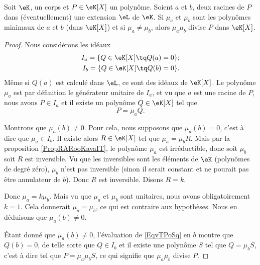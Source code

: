 \begin{proposition} \label{PropyMTEbH}
    Soit \( \eK\), un corps et \( P\in \eK[X]\) un polynôme. Soient \( a\) et \( b\), deux racines de \( P\) dans (éventuellement) une extension \( \eL\) de \( \eK\). Si \( \mu_a\) et \( \mu_b\) sont les polynômes minimaux de \( a\) et \( b\) (dans \( \eK[X]\)) et si \( \mu_a\neq \mu_b\), alors \( \mu_a\mu_b\) divise \( P\) dans \( \eK[X]\).
\end{proposition}

\begin{proof}
    Nous considérons les idéaux
    \begin{subequations}
        \begin{align}
            I_a=\{ Q\in \eK[X]\tq Q(a)=0 \};\\
            I_b=\{ Q\in \eK[X]\tq Q(b)=0 \}.
        \end{align}
    \end{subequations}
    Même si \( Q(a)\) est calculé dans \( \eL\), ce sont des idéaux de \( \eK[X]\). Le polynôme \( \mu_a\) est par définition le générateur unitaire de \( I_a\), et vu que \( a\) est une racine de \( P\), nous avons \( P\in I_a\) et il existe un polynôme \( Q\in \eK[X]\) tel que 
    \begin{equation}    \label{EqvTPoSq}
        P=\mu_aQ.
    \end{equation}

    Montrons que \( \mu_a(b)\neq 0\). Pour cela, nous  supposons que \( \mu_a(b)=0\), c'est à dire que \( \mu_a\in I_b\). Il existe alors \( R\in \eK[X]\) tel que \( \mu_a=\mu_bR\). Mais par la proposition \ref{PropRARooKavaIT}, le polynôme \( \mu_a\) est irréductible, donc soit \( \mu_b\) soit \( R\) est inversible. Vu que les inversibles sont les éléments de \( \eK\) (polynômes de degré zéro), \( \mu_b\) n'est pas inversible (sinon il serait constant et ne pourait pas être annulateur de \( b\)). Donc \( R\) est inversible. Disons \( R=k\).

    Donc \( \mu_a=k\mu_b\). Mais vu que \( \mu_a\) et \( \mu_b\) sont unitaires, nous avons obligatoirement \( k=1\). Cela donnerait \( \mu_a=\mu_b\), ce qui est contraire aux hypothèses. Nous en déduisons que \( \mu_a(b)\neq 0\).

    Étant donné que \( \mu_a(b)\neq 0\), l'évaluation de \eqref{EqvTPoSq} en \( b\) montre que \( Q(b)=0\), de telle sorte que \( Q\in I_b\) et il existe une polynôme \( S\) tel que \( Q=\mu_bS\), c'est à dire tel que \( P=\mu_a\mu_bS\), ce qui signifie que \( \mu_a\mu_b\) divise \( P\).
\end{proof}

